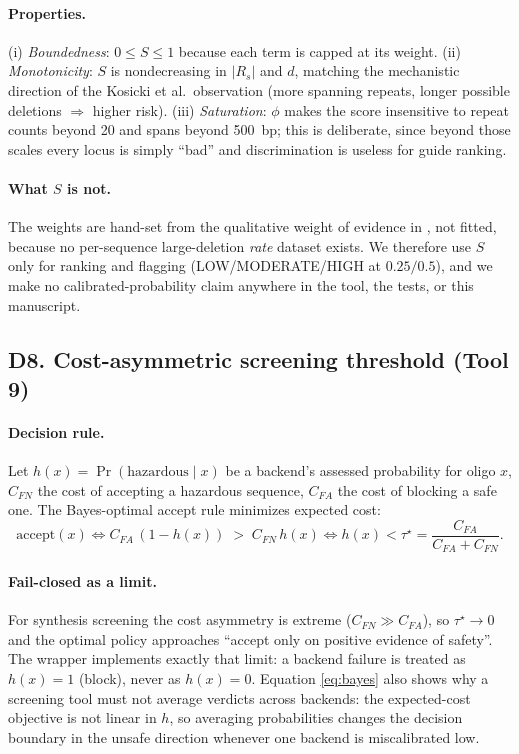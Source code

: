 \paragraph{Properties.} (i) \emph{Boundedness}: $0 \le S \le 1$ because
each term is capped at its weight. (ii) \emph{Monotonicity}: $S$ is
nondecreasing in $|R_s|$ and $d$, matching the mechanistic direction of
the Kosicki et al.\ observation (more spanning repeats, longer possible
deletions $\Rightarrow$ higher risk). (iii) \emph{Saturation}: $\phi$
makes the score insensitive to repeat counts beyond 20 and spans beyond
500~bp; this is deliberate, since beyond those scales every locus is
simply ``bad'' and discrimination is useless for guide ranking.
\paragraph{What $S$ is not.} The weights are hand-set from the qualitative
weight of evidence in \cite{kosicki2018, wen2022}, not fitted, because no
per-sequence large-deletion \emph{rate} dataset exists. We therefore use
$S$ only for ranking and flagging (LOW/MODERATE/HIGH at $0.25/0.5$), and
we make no calibrated-probability claim anywhere in the tool, the tests,
or this manuscript.

\subsection{D8. Cost-asymmetric screening threshold (Tool 9)}
\paragraph{Decision rule.} Let $h(x) = \Pr(\text{hazardous} \mid x)$ be a
backend's assessed probability for oligo $x$, $C_{FN}$ the cost of
accepting a hazardous sequence, $C_{FA}$ the cost of blocking a safe one.
The Bayes-optimal accept rule minimizes expected cost:
\begin{equation}
\text{accept}(x) \iff C_{FA}\,(1 - h(x)) \;>\; C_{FN}\, h(x)
\iff h(x) < \tau^{\star} = \frac{C_{FA}}{C_{FA} + C_{FN}}.
\label{eq:bayes}
\end{equation}
\paragraph{Fail-closed as a limit.} For synthesis screening the cost
asymmetry is extreme ($C_{FN} \gg C_{FA}$), so $\tau^{\star} \to 0$ and
the optimal policy approaches ``accept only on positive evidence of
safety''. The wrapper implements exactly that limit: a backend failure is
treated as $h(x) = 1$ (block), never as $h(x) = 0$. Equation
\eqref{eq:bayes} also shows why a screening tool must not average verdicts
across backends: the expected-cost objective is not linear in $h$, so
averaging probabilities changes the decision boundary in the unsafe
direction whenever one backend is miscalibrated low.

